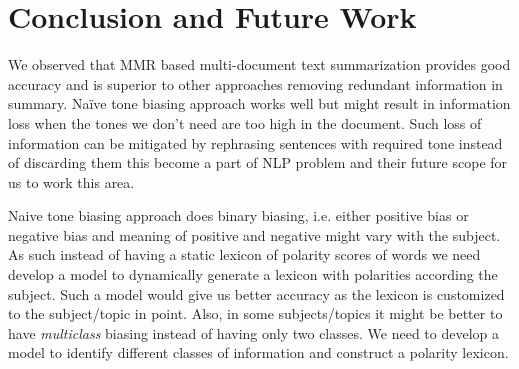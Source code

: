 \documentclass[conference]{IEEEtran}
\begin{document}
\section{Conclusion and Future Work}
We observed that MMR based multi-document text summarization provides good accuracy and is superior to other approaches removing redundant information in summary. Naïve tone biasing approach works well but might result in information loss when the tones we don’t need are too high in the document. Such loss of information can be mitigated by rephrasing sentences with required tone instead of discarding them this become a part of NLP problem and their future scope for us to work this area.

Naive tone biasing approach does binary biasing, i.e. either positive bias or negative bias and meaning of positive and negative might vary with the subject. As such instead of having a static lexicon of polarity scores of words we need develop a model to dynamically generate a lexicon with polarities according the subject. Such a model would give us better accuracy as the lexicon is customized to the subject/topic in point. Also, in some subjects/topics it might be better to have \textit{multiclass} biasing instead of having only two classes. We need to develop a model to identify different classes of information and construct a polarity lexicon.













\end{document}
